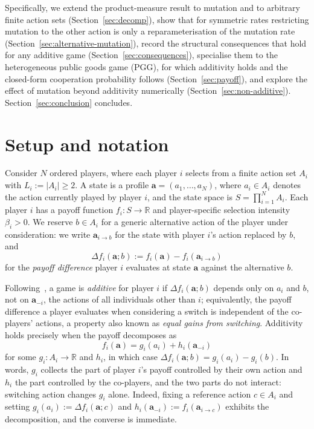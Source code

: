 \documentclass[11pt]{article}
\newcommand{\bfa}{\mathbf{a}}
\begin{document}
Specifically, we extend the product-measure result to mutation and to arbitrary
finite action sets (Section~\ref{sec:decomp}),
show that for symmetric rates restricting mutation to the other action is
only a reparameterisation of the mutation rate
(Section~\ref{sec:alternative-mutation}),
record the structural consequences that hold for any additive game
(Section~\ref{sec:consequences}), specialise them to the heterogeneous public goods
game (PGG), for which additivity holds and the closed-form cooperation probability
follows
(Section~\ref{sec:payoff}), and explore the effect of mutation beyond additivity
numerically (Section~\ref{sec:non-additive}).
Section~\ref{sec:conclusion} concludes.

\section{Setup and notation}\label{sec:setup}

Consider \(N\) ordered players, where each player \(i\) selects from a finite
action set \(A_i\) with \(L_i:=|A_i|\ge2\). A state is a profile
\(\bfa=(a_1,\dots,a_N)\), where \(a_i\in A_i\) denotes the action currently
played by player \(i\), and the state space is \(S=\prod_{i=1}^{N}A_i\). Each
player \(i\) has a payoff function \(f_i:S\to\mathbb{R}\) and player-specific
selection intensity \(\beta_i>0\). We reserve \(b\in A_i\) for a generic
alternative action of the player under consideration: we write
\(\bfa_{i\to b}\) for the state with player \(i\)'s action replaced by \(b\),
and
\[
  \Delta f_i(\bfa; b) := f_i(\bfa) - f_i(\bfa_{i\to b})
\]
for the \emph{payoff difference} player \(i\) evaluates at state \(\bfa\)
against the alternative \(b\).

Following~\cite{couto2023multiplayer}, a game is \emph{additive} for player
\(i\) if \(\Delta f_i(\bfa;b)\) depends only on \(a_i\) and \(b\), not on
\(\bfa_{-i}\), the actions of all individuals other than \(i\); equivalently,
the payoff difference a player evaluates when considering a switch is
independent of the co-players' actions, a property also known as \emph{equal
gains from switching}. Additivity holds precisely when the payoff decomposes
as
\begin{equation}\label{eq:additive-decomposition}
  f_i(\bfa) = g_i(a_i) + h_i(\bfa_{-i})
\end{equation}
for some \(g_i:A_i\to\mathbb{R}\) and \(h_i\), in which case
\(\Delta f_i(\bfa;b)=g_i(a_i)-g_i(b)\). In words, \(g_i\) collects the part
of player \(i\)'s payoff controlled by their own action and \(h_i\) the part
controlled by the co-players, and the two parts do not interact: switching
action changes \(g_i\) alone. Indeed, fixing a reference action
\(c\in A_i\) and setting \(g_i(a_i):=\Delta f_i(\bfa;c)\) and
\(h_i(\bfa_{-i}):=f_i(\bfa_{i\to c})\) exhibits the decomposition, and the
converse is immediate.
\end{document}
